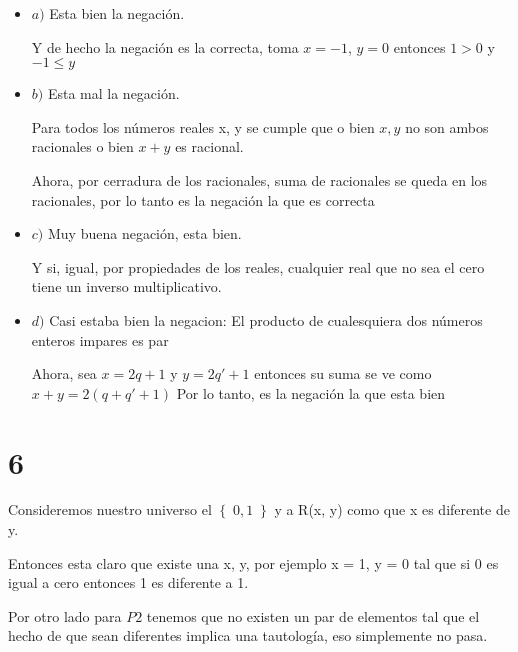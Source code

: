 \documentclass[12pt, fleqn]{article}                            %
\theoremstyle{break}                                            %
\newcommand{\Set}[1]            {\left\{ \; #1 \; \right\}}     %
\begin{document}
    \begin{itemize}
        
        \item $a)$
            Esta bien la negación.

            Y de hecho la negación es la correcta, toma $x = -1$, $y = 0$
            entonces $1 > 0$ y $-1 \leq y$

        \item $b)$
            Esta mal la negación.

            Para todos los números reales x, y se cumple que o bien
            $x, y$ no son ambos racionales o bien $x+y$ es racional.

            Ahora, por cerradura de los racionales, suma de racionales se queda
            en los racionales, por lo tanto es la negación la que es correcta

        \item $c)$
            Muy buena negación, esta bien.

            Y si, igual, por propiedades de los reales, cualquier real
            que no sea el cero tiene un inverso multiplicativo.

        \item $d)$
            Casi estaba bien la negacion: 
            El producto de cualesquiera dos números enteros
            impares es par

            Ahora, sea $x = 2q + 1$ y $y = 2q' + 1$
            entonces su suma se ve como $x+y=2(q + q' + 1)$
            Por lo tanto, es la negación la que esta bien


    \end{itemize}



\vspace{1em}
\section{6}

    Consideremos nuestro universo el $\Set{ 0, 1}$
    y a R(x, y) como que x es diferente de y.

    Entonces esta claro que existe una x, y, por ejemplo
    x = 1, y = 0 tal que si 0 es igual a cero entonces 1 es diferente a 1.

    Por otro lado para $P2$ tenemos que no existen un par de elementos
    tal que el hecho de que sean diferentes implica una tautología, eso simplemente
    no pasa.
\end{document}
